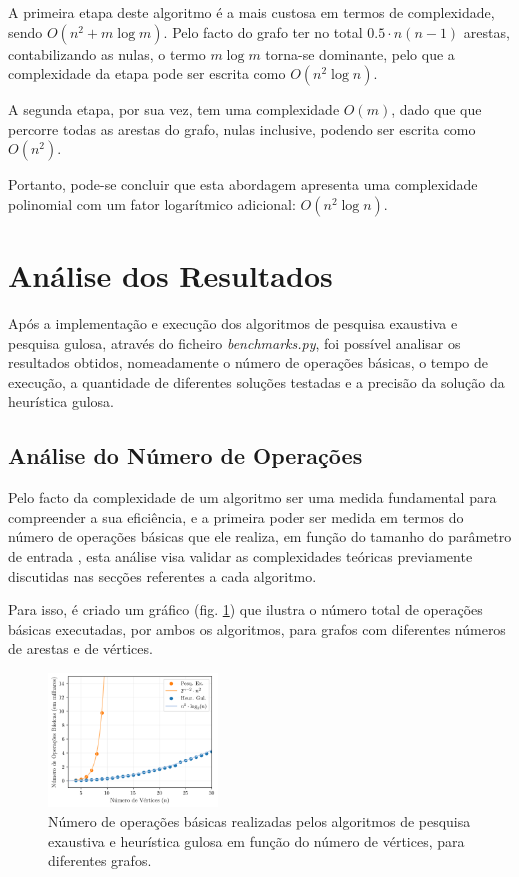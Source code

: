 \documentclass[mirror]{revdetua}
\begin{document}
A primeira etapa deste algoritmo é a mais custosa em termos de complexidade, sendo $O(n^2 + m \log m)$. Pelo facto do grafo ter no total $0.5 \cdot n(n-1)$ arestas, contabilizando as nulas, o termo $m \log m$ torna-se dominante, pelo que a complexidade da etapa pode ser escrita como $O(n^2 \log n)$.

A segunda etapa, por sua vez, tem uma complexidade $O(m)$, dado que que percorre todas as arestas do grafo, nulas inclusive, podendo ser escrita como $O(n^2)$.

Portanto, pode-se concluir que esta abordagem apresenta uma complexidade polinomial com um fator logarítmico adicional: $O(n^2 \log n)$.

\section{Análise dos Resultados}

Após a implementação e execução dos algoritmos de pesquisa exaustiva e pesquisa gulosa, através do ficheiro \textit{benchmarks.py}, foi possível analisar os resultados obtidos, nomeadamente o número de operações básicas, o tempo de execução, a quantidade de diferentes soluções testadas e a precisão da solução da heurística gulosa.

\subsection{Análise do Número de Operações}

Pelo facto da complexidade de um algoritmo ser uma medida fundamental para compreender a sua eficiência, e a primeira poder ser medida em termos do número de operações básicas que ele realiza, em função do tamanho do parâmetro de entrada \cite{BS22}, esta análise visa validar as complexidades teóricas previamente discutidas nas secções referentes a cada algoritmo.

Para isso, é criado um gráfico (fig. \ref{fig:numeroops}) que ilustra o número total de operações básicas executadas, por ambos os algoritmos, para grafos com diferentes números de arestas e de vértices.

\begin{figure}[h]
    \centering
    \includegraphics[width=0.4\textwidth]{../assets/numberOPS.png}
    \caption{Número de operações básicas realizadas pelos algoritmos de pesquisa exaustiva e heurística gulosa em função do número de vértices, para diferentes grafos.}
    \label{fig:numeroops}
\end{figure}
\end{document}
